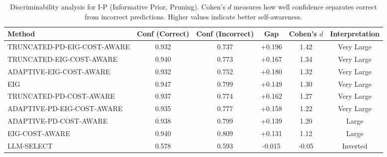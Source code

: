 \begin{table}[htbp]
\centering
\small
\caption{Discriminability analysis for I-P (Informative Prior, Pruning). Cohen's $d$ measures how well confidence separates correct from incorrect predictions. Higher values indicate better self-awareness.}
\label{tab:discriminability-prune_notuniform}
\begin{tabular}{@{}lccccc@{}}
\toprule
Method & Conf (Correct) & Conf (Incorrect) & Gap & Cohen's $d$ & Interpretation \\
\midrule
TRUNCATED-PD-EIG-COST-AWARE & 0.932 & 0.737 & +0.196 & 1.42 & Very Large \\
TRUNCATED-EIG-COST-AWARE & 0.940 & 0.773 & +0.167 & 1.34 & Very Large \\
ADAPTIVE-EIG-COST-AWARE & 0.932 & 0.752 & +0.180 & 1.32 & Very Large \\
EIG & 0.947 & 0.799 & +0.149 & 1.30 & Very Large \\
TRUNCATED-PD-COST-AWARE & 0.937 & 0.774 & +0.162 & 1.27 & Very Large \\
ADAPTIVE-PD-EIG-COST-AWARE & 0.935 & 0.777 & +0.158 & 1.22 & Very Large \\
ADAPTIVE-PD-COST-AWARE & 0.938 & 0.799 & +0.139 & 1.20 & Large \\
EIG-COST-AWARE & 0.940 & 0.809 & +0.131 & 1.12 & Large \\
LLM-SELECT & 0.578 & 0.593 & -0.015 & -0.05 & Inverted \\
\bottomrule
\end{tabular}
\end{table}
